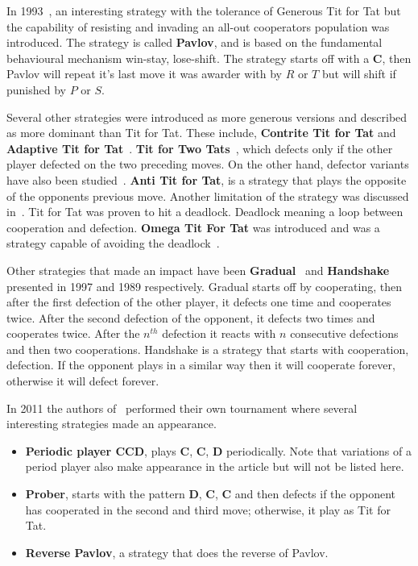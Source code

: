 \documentclass{article}
\begin{document}
In 1993~\cite{Nowak1993}, an interesting strategy with the 
tolerance of Generous Tit for Tat but the capability of resisting and invading
an all-out cooperators population was introduced. The strategy is called \textbf{Pavlov},
and is based on the fundamental behavioural mechanism win-stay, lose-shift.
The strategy starts off with a \textbf{C}, then Pavlov will repeat it's last
move it was awarder with by \(R\) or \(T\) but will shift if punished by \(P\) or
\(S\).

Several other strategies were introduced as more generous versions and 
described as more dominant than Tit for Tat. These include, \textbf{Contrite Tit for Tat}
\cite{Wu1995} and \textbf{Adaptive Tit for Tat}~\cite{tzafestas-2000a}.
\textbf{Tit for Two Tats}~\cite{axelrod1988}, which defects only if the other
player defected on the two preceding moves. On the
other hand, defector variants have also been studied~\cite{Hilde2013}.
\textbf{Anti Tit for Tat}, is a strategy that plays the opposite of the opponents
previous move. Another limitation of the strategy was discussed in~\cite{Wolfgang2006}.
Tit for Tat was proven to hit a deadlock. Deadlock meaning a loop between 
cooperation and defection. \textbf{Omega Tit For Tat} was introduced and was
a strategy capable of avoiding the deadlock~\cite{Wolfgang2006}.

Other strategies that made an impact have been \textbf{Gradual}~\cite{Beaufils1997}
and \textbf{Handshake}~\cite{Robson1989} presented in 1997 and 1989 respectively.
Gradual starts off by cooperating, then after the first defection of the other player, 
it defects one time and cooperates twice. After the second defection of the opponent,
it defects two times and cooperates twice. After the \(n^{th}\) defection it reacts with 
\(n\) consecutive defections and then two cooperations. 
Handshake is a strategy that starts with cooperation, defection. If the opponent plays in
a similar way then it will cooperate forever, otherwise it will defect forever.

In 2011 the authors of~\cite{Li2011} performed their own tournament where several interesting
strategies made an appearance. 

\begin{itemize}
    \item \textbf{Periodic player CCD}, plays \textbf{C}, \textbf{C}, \textbf{D} 
    periodically. Note that variations of a period player also make appearance
    in the article but will not be listed here.
    \item \textbf{Prober}, starts with the pattern \textbf{D}, \textbf{C}, \textbf{C}
     and then defects if the opponent has cooperated in the second and third move;
     otherwise, it play as Tit for Tat.
    \item \textbf{Reverse Pavlov}, a strategy that does the reverse of Pavlov.
\end{itemize}
\end{document}
